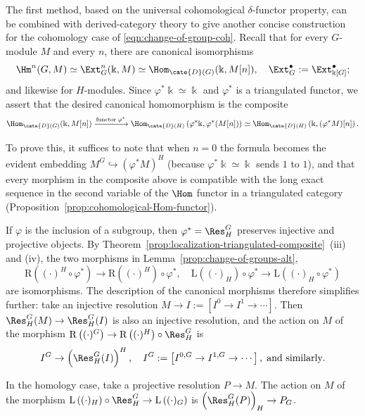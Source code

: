 \begin{remark}\label{rem:change-of-group-Yoneda}
	The first method, based on the universal cohomological
	$\delta$-functor property, can be combined with derived-category theory
	to give another concise construction for the cohomology case of
	\eqref{eqn:change-of-group-coh}. Recall that for every $G$-module $M$ and
	every $n$, there are canonical isomorphisms
	\[ \Hm^n(G, M) \simeq \Ext^n_G(\Bbbk, M) \simeq \Hom_{\cate{D}(G)}(\Bbbk, M[n]), \quad \Ext^\bullet_G := \Ext^\bullet_{\Bbbk[G]}; \]
	and likewise for $H$-modules. Since
	$\varphi^*\Bbbk\simeq\Bbbk$ and $\varphi^*$ is a triangulated functor, we
	assert that the desired canonical homomorphism is the composite
	\[ \Hom_{\cate{D}(G)}(\Bbbk, M[n]) \xrightarrow{\text{functor} \;\varphi^*} \Hom_{\cate{D}(H)}\left( \varphi^* \Bbbk, \varphi^* (M[n])\right) \simeq \Hom_{\cate{D}(H)}\left(\Bbbk, (\varphi^* M)[n]\right). \]

	To prove this, it suffices to note that when $n=0$ the formula becomes the
	evident embedding $M^G\hookrightarrow(\varphi^*M)^H$ (because
	$\varphi^*\Bbbk\simeq\Bbbk$ sends $1$ to $1$), and that every morphism in
	the composite above is compatible with the long exact sequence in the
	second variable of the $\Hom$ functor in a triangulated category
	(Proposition~\ref{prop:cohomological-Hom-functor}).
\end{remark}

\begin{remark}\label{rem:change-of-group-coh}
	If $\varphi$ is the inclusion of a subgroup, then
	$\varphi^*=\Res^G_H$ preserves injective and projective objects. By
	Theorem~\ref{prop:localization-triangulated-composite}~(iii) and (iv), the
	two morphisms in Lemma~\ref{prop:change-of-groups-alt},
	\[ \mathrm{R}\left( (\cdot)^H \circ \varphi^* \right) \to \mathrm{R}\left( (\cdot)^H \right) \circ \varphi^*, \quad
	\mathrm{L}\left( (\cdot)_H \right) \circ \varphi^* \to \mathrm{L} \left( (\cdot)_H \circ \varphi^* \right) \]
	are isomorphisms. The description of the canonical morphisms therefore
	simplifies further: take an injective resolution
	$M\to I:=[I^0\to I^1\to\cdots]$. Then
	$\Res^G_H(M)\to\Res^G_H(I)$ is also an injective resolution, and the
	action on $M$ of the morphism
	$\mathrm{R}\left((\cdot)^G\right)\to
	\mathrm{R}\left((\cdot)^H\right)\circ\Res^G_H$ is
	\[ I^G \to \left( \Res^G_H(I)\right)^H, \quad I^G := \left[ I^{0, G} \to I^{1, G} \to \cdots \right], \;\text{and similarly}. \]

	In the homology case, take a projective resolution $P\to M$. The action on
	$M$ of the morphism
	$\mathrm{L}\left((\cdot)_H\right)\circ\Res^G_H
	\to\mathrm{L}\left((\cdot)_G\right)$ is
	$\left(\Res^G_H(P)\right)_H\to P_G$.
\end{remark}

